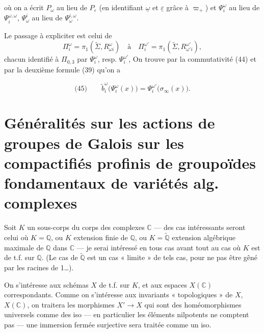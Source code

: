 \documentclass[11pt,a4paper]{article}
\begin{document}
où on a écrit $P_\omega$ au lieu de $P_\varepsilon$ (en identifiant $\underline{\omega}$ et $\underline{\varepsilon}$ grâce à $\varpi_+$) et $\Psi_i^{\omega}$ au lieu de $\Psi_i^{\omega,\omega}$, $\Psi_\omega^{i}$ au lieu de $\Psi_\omega^{i,\omega}$.

Le passage à expliciter est celui de 
\[
\Pi_i^{\omega} = \pi_1(\widetilde{\Sigma},R^{\omega}_{\omega i}) \quad\text{à}\quad \Pi_i^{\omega'} = \pi_1(\widetilde{\Sigma},R^{\omega'}_{\omega' i}),
\]
chacun identifié à $\Pi_{0,3}$ par $\Psi_i^{\omega}$, resp. $\Psi_i^{\omega'}$,  On trouve par la commutativité (44) et par la deuxième formule (39) qu'on a


\[
\text{(45)}\qquad \widetilde{b}_i^{\omega}\bigl(\Psi_i^{\omega}(x)\bigr) = \Psi_i^{\omega'}\bigl(\sigma_\infty(x)\bigr) .
\]

\section{Généralités sur les actions de groupes de Galois sur les compactifiés profinis de groupoïdes fondamentaux de variétés alg. complexes}

Soit $K$ un sous-corps du corps des complexes $\mathbb{C}$ — des cas intéressants seront celui où $K = \mathbb{Q}$, ou $K$ extension finie de $\mathbb{Q}$, ou $K = \widetilde{\mathbb{Q}}$ extension algébrique maximale de $\mathbb{Q}$ dans $\mathbb{C}$ — je serai intéressé en tous cas avant tout au cas où $K$ est de t.f. sur $\mathbb{Q}$. (Le cas de $\widetilde{\mathbb{Q}}$ est un cas « limite » de tels cas, pour ne pas être gêné par les racines de 1…).

On s'intéresse aux schémas $X$ de t.f. sur $K$, et aux espaces  $X(\mathbb{C})$ correspondants. Comme on s'intéresse aux invariants « topologiques » de $X$, $X(\mathbb{C})$, on traitera les morphismes $X' \to X$ qui sont des homéomorphismes universels comme des iso — en particulier les éléments nilpotents ne comptent pas — une immersion fermée surjective sera traitée comme un iso.
\end{document}
